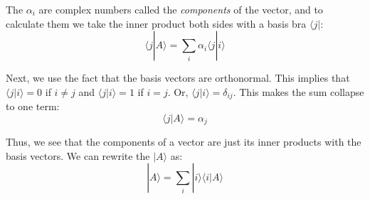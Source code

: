 \documentclass[a4paper,10pt]{article}
\begin{document}
The $\alpha_i$ are complex numbers called the \textit{components} of the vector, and to calculate them we take the inner product both sides with a basis bra $\langle j|$:
$$\langle j|A\rangle = \sum\limits_{i}\alpha_i\langle j|i\rangle$$

Next, we use the fact that the basis vectors are orthonormal. This implies that $\langle j|i\rangle = 0$ if $i \neq j$ and $\langle j|i\rangle = 1$ if $i = j$. Or, $\langle j|i\rangle = \delta_{ij}$. This makes the sum collapse to one term:
$$\langle j|A\rangle = \alpha_j$$

Thus, we see that the components of a vector are just its inner products with the basis vectors. We can rewrite the $|A\rangle$ as:
$$|A\rangle = \sum\limits_{i}|i\rangle\langle i|A\rangle$$

\end{document}
